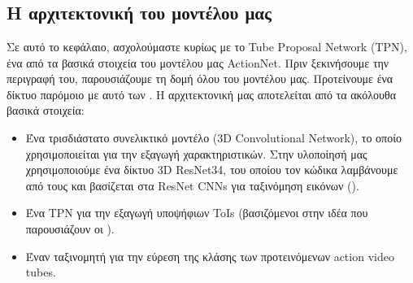 



% 


% 
\chapter{}
\section{ Η αρχιτεκτονική του μοντέλου μας}
Σε αυτό το κεφάλαιο, ασχολούμαστε κυρίως με  το \en Tube Proposal Network (TPN)\gr, ένα από τα βασικά στοιχεία του μοντέλου μας \en ActionNet\gr. Πριν ξεκινήσουμε την
περιγραφή του, παρουσιάζουμε τη δομή όλου του μοντέλου μας. Προτείνουμε ένα δίκτυο παρόμοιο με αυτό των \en\cite{DBLP:journals/corr/HouCS17}\gr.
Η αρχιτεκτονική μας αποτελείται από τα ακόλουθα βασικά στοιχεία:
\begin{itemize}
\item Ένα τρισδιάστατο συνελικτικό μοντέλο \en(3D Convolutional Network)\gr, το οποίο χρησιμοποιείται για την εξαγωγή χαρακτηριστικών.
  Στην υλοποίησή μας χρησιμοποιούμε ένα δίκτυο \en 3D ResNet34\gr, του  οποίου τον κώδικα  λαμβάνουμε  από τους \en\cite{hara3dcnns} \gr  και βασίζεται   στα \en ResNet CNNs \gr για  ταξινόμηση εικόνων \en(\cite{DBLP:journals/corr/HeZRS15})\gr.
\item Ένα \en TPN \gr για την εξαγωγή υποψήφιων \en ToIs \gr (βασιζόμενοι στην ιδέα που παρουσιάζουν οι \en \cite{DBLP:journals/corr/HouCS17} \gr).
\item Έναν ταξινομητή για την εύρεση της κλάσης των προτεινόμενων \en action video tubes\gr.
\end{itemize}


